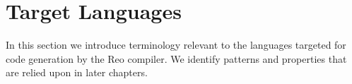 %
%	
%	
%	

\section{Target Languages}
In this section we introduce terminology relevant to the languages targeted for code generation by the Reo compiler. We identify patterns and properties that are relied upon in later chapters.

